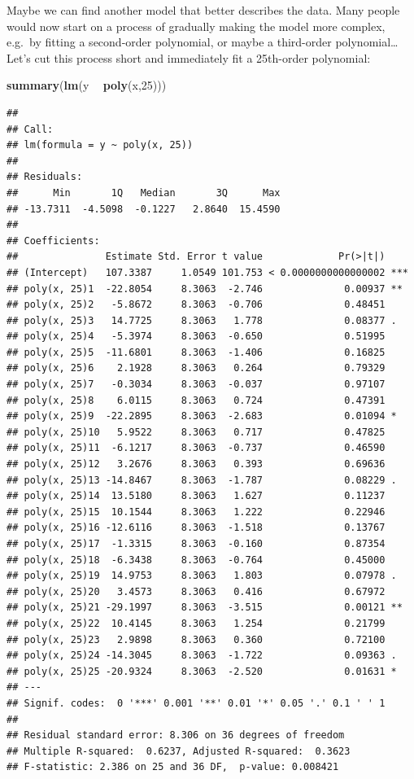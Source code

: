 \documentclass[
]{book}
\newenvironment{Shaded}{\begin{snugshade}}{\end{snugshade}}
\newcommand{\DecValTok}[1]{\textcolor[rgb]{0.00,0.00,0.81}{#1}}
\newcommand{\KeywordTok}[1]{\textcolor[rgb]{0.13,0.29,0.53}{\textbf{#1}}}
\newcommand{\NormalTok}[1]{#1}
\newcommand{\OperatorTok}[1]{\textcolor[rgb]{0.81,0.36,0.00}{\textbf{#1}}}
\newcommand{\StringTok}[1]{\textcolor[rgb]{0.31,0.60,0.02}{#1}}
\begin{document}
Maybe we can find another model that better describes the data. Many people would now start on a process of gradually making the model more complex, e.g.~by fitting a second-order polynomial, or maybe a third-order polynomial\ldots{} Let's cut this process short and immediately fit a 25th-order polynomial:

\begin{Shaded}
\begin{Highlighting}[]
\KeywordTok{summary}\NormalTok{(}\KeywordTok{lm}\NormalTok{(y }\OperatorTok{~}\StringTok{ }\KeywordTok{poly}\NormalTok{(x,}\DecValTok{25}\NormalTok{)))}
\end{Highlighting}
\end{Shaded}

\begin{verbatim}
## 
## Call:
## lm(formula = y ~ poly(x, 25))
## 
## Residuals:
##      Min       1Q   Median       3Q      Max 
## -13.7311  -4.5098  -0.1227   2.8640  15.4590 
## 
## Coefficients:
##               Estimate Std. Error t value             Pr(>|t|)    
## (Intercept)   107.3387     1.0549 101.753 < 0.0000000000000002 ***
## poly(x, 25)1  -22.8054     8.3063  -2.746              0.00937 ** 
## poly(x, 25)2   -5.8672     8.3063  -0.706              0.48451    
## poly(x, 25)3   14.7725     8.3063   1.778              0.08377 .  
## poly(x, 25)4   -5.3974     8.3063  -0.650              0.51995    
## poly(x, 25)5  -11.6801     8.3063  -1.406              0.16825    
## poly(x, 25)6    2.1928     8.3063   0.264              0.79329    
## poly(x, 25)7   -0.3034     8.3063  -0.037              0.97107    
## poly(x, 25)8    6.0115     8.3063   0.724              0.47391    
## poly(x, 25)9  -22.2895     8.3063  -2.683              0.01094 *  
## poly(x, 25)10   5.9522     8.3063   0.717              0.47825    
## poly(x, 25)11  -6.1217     8.3063  -0.737              0.46590    
## poly(x, 25)12   3.2676     8.3063   0.393              0.69636    
## poly(x, 25)13 -14.8467     8.3063  -1.787              0.08229 .  
## poly(x, 25)14  13.5180     8.3063   1.627              0.11237    
## poly(x, 25)15  10.1544     8.3063   1.222              0.22946    
## poly(x, 25)16 -12.6116     8.3063  -1.518              0.13767    
## poly(x, 25)17  -1.3315     8.3063  -0.160              0.87354    
## poly(x, 25)18  -6.3438     8.3063  -0.764              0.45000    
## poly(x, 25)19  14.9753     8.3063   1.803              0.07978 .  
## poly(x, 25)20   3.4573     8.3063   0.416              0.67972    
## poly(x, 25)21 -29.1997     8.3063  -3.515              0.00121 ** 
## poly(x, 25)22  10.4145     8.3063   1.254              0.21799    
## poly(x, 25)23   2.9898     8.3063   0.360              0.72100    
## poly(x, 25)24 -14.3045     8.3063  -1.722              0.09363 .  
## poly(x, 25)25 -20.9324     8.3063  -2.520              0.01631 *  
## ---
## Signif. codes:  0 '***' 0.001 '**' 0.01 '*' 0.05 '.' 0.1 ' ' 1
## 
## Residual standard error: 8.306 on 36 degrees of freedom
## Multiple R-squared:  0.6237, Adjusted R-squared:  0.3623 
## F-statistic: 2.386 on 25 and 36 DF,  p-value: 0.008421
\end{verbatim}
\end{document}
